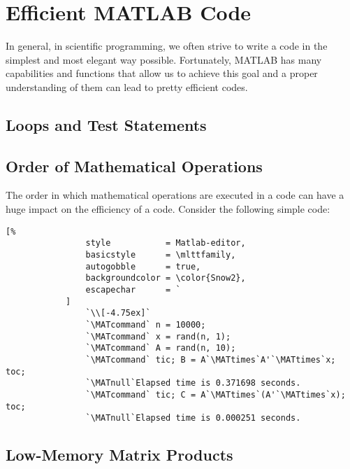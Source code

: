 \documentclass[10pt, twoside]{book}
\begin{document}
	\chapter{\label{chp:MATLABpointers}Efficient MATLAB Code}
		
		In general, in scientific programming, we often strive to write a code in the simplest and most elegant way possible. Fortunately, MATLAB has many capabilities and functions that allow us to achieve this goal and a proper understanding of them can lead to pretty efficient codes.
		
		\section{\label{sec:LoopsChecks}Loops and Test Statements}
			
		\section{\label{sec:OperationOrder}Order of Mathematical Operations}
			
			The order in which mathematical operations are executed in a code can have a huge impact on the efficiency of a code. Consider the following simple code:
			\begin{lstlisting}[%
				style           = Matlab-editor,
				basicstyle      = \mlttfamily,
				autogobble      = true,
				backgroundcolor = \color{Snow2},
				escapechar      = `
			]
				`\\[-4.75ex]`
				`\MATcommand` n = 10000;
				`\MATcommand` x = rand(n, 1);
				`\MATcommand` A = rand(n, 10);
				`\MATcommand` tic; B = A`\MATtimes`A'`\MATtimes`x; toc;
				`\MATnull`Elapsed time is 0.371698 seconds.
				`\MATcommand` tic; C = A`\MATtimes`(A'`\MATtimes`x); toc;
				`\MATnull`Elapsed time is 0.000251 seconds.
			\end{lstlisting}
			
		\section{\label{sec:MatrixProducts}Low-Memory Matrix Products}
			
\end{document}
